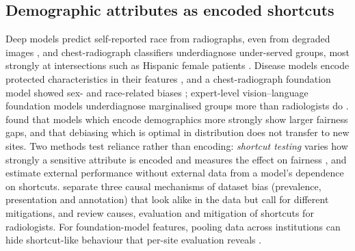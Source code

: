 \documentclass[11pt,a4paper]{article}
\begin{document}
\subsection{Demographic attributes as encoded shortcuts}
Deep models predict self-reported race from radiographs, even from degraded images \citep{gichoya2022race}, and
chest-radiograph classifiers underdiagnose under-served groups, most strongly at intersections such as Hispanic
female patients \citep{seyyedkalantari2021underdiagnosis}. Disease models encode protected characteristics in their
features \citep{glocker2023encoding}, and a chest-radiograph foundation model showed sex- and race-related biases
\citep{glocker2023foundation}; expert-level vision--language foundation models underdiagnose marginalised groups more
than radiologists do \citep{yang2025demographic}. \citet{yang2024limits} found that models which encode demographics
more strongly show larger fairness gaps, and that debiasing which is optimal in distribution does not transfer to new
sites. Two methods test reliance rather than encoding: \emph{shortcut testing} varies how strongly a sensitive attribute
is encoded and measures the effect on fairness \citep{brown2023shortcut}, and \citet{ongly2024shortcut} estimate
external performance without external data from a model's dependence on shortcuts. \citet{jones2024causal} separate
three causal mechanisms of dataset bias (prevalence, presentation and annotation) that look alike in the data but call
for different mitigations, and \citet{banerjee2023shortcuts} review causes, evaluation and mitigation of shortcuts for
radiologists. For foundation-model features, pooling data across institutions can hide shortcut-like behaviour that
per-site evaluation reveals \citep{germani2026aggregation}.
\end{document}

